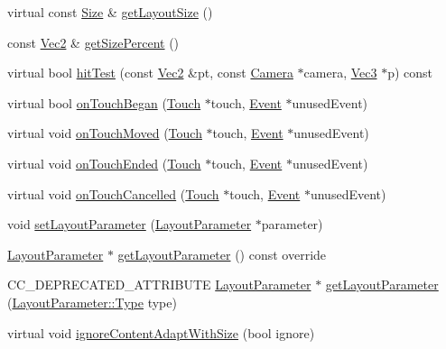 \begin{DoxyCompactItemize}
\item 
virtual const \hyperlink{classSize}{Size} \& \hyperlink{classui_1_1Widget_a170d1942e94f24cc01aa7cb146b10dc8}{get\+Layout\+Size} ()
\item 
const \hyperlink{classVec2}{Vec2} \& \hyperlink{classui_1_1Widget_a5621f3e1ffe53f3dfb844d0d9dace4ba}{get\+Size\+Percent} ()
\item 
virtual bool \hyperlink{classui_1_1Widget_ab44cccca898684bd50944575ce9d8ab3}{hit\+Test} (const \hyperlink{classVec2}{Vec2} \&pt, const \hyperlink{classCamera}{Camera} $\ast$camera, \hyperlink{classVec3}{Vec3} $\ast$p) const
\item 
virtual bool \hyperlink{classui_1_1Widget_a7885c770dde6daef771515c9857674a8}{on\+Touch\+Began} (\hyperlink{classTouch}{Touch} $\ast$touch, \hyperlink{classEvent}{Event} $\ast$unused\+Event)
\item 
virtual void \hyperlink{classui_1_1Widget_a16e6247b1c43273eac77623e8f129dd4}{on\+Touch\+Moved} (\hyperlink{classTouch}{Touch} $\ast$touch, \hyperlink{classEvent}{Event} $\ast$unused\+Event)
\item 
virtual void \hyperlink{classui_1_1Widget_ac4d1576dfe1f3cf0a509f2d2ca0c5b90}{on\+Touch\+Ended} (\hyperlink{classTouch}{Touch} $\ast$touch, \hyperlink{classEvent}{Event} $\ast$unused\+Event)
\item 
virtual void \hyperlink{classui_1_1Widget_a8622ea26dcf72e2197d1a1b0d6ce9cbd}{on\+Touch\+Cancelled} (\hyperlink{classTouch}{Touch} $\ast$touch, \hyperlink{classEvent}{Event} $\ast$unused\+Event)
\item 
void \hyperlink{classui_1_1Widget_abf9d727a2726259f82c097543d0be2d1}{set\+Layout\+Parameter} (\hyperlink{classui_1_1LayoutParameter}{Layout\+Parameter} $\ast$parameter)
\item 
\hyperlink{classui_1_1LayoutParameter}{Layout\+Parameter} $\ast$ \hyperlink{classui_1_1Widget_a25425cde194b4f37f56f938bb69a9a96}{get\+Layout\+Parameter} () const override
\item 
C\+C\+\_\+\+D\+E\+P\+R\+E\+C\+A\+T\+E\+D\+\_\+\+A\+T\+T\+R\+I\+B\+U\+TE \hyperlink{classui_1_1LayoutParameter}{Layout\+Parameter} $\ast$ \hyperlink{classui_1_1Widget_a21caaf4dc8eb3c5b9e4ca4873ffc049d}{get\+Layout\+Parameter} (\hyperlink{classui_1_1LayoutParameter_a1b01e01e7e6fc3de80f2e6d07fae806e}{Layout\+Parameter\+::\+Type} type)
\item 
virtual void \hyperlink{classui_1_1Widget_a47ec556e48f2ac20290c197e30434d36}{ignore\+Content\+Adapt\+With\+Size} (bool ignore)
\item 

\end{DoxyCompactItemize}
